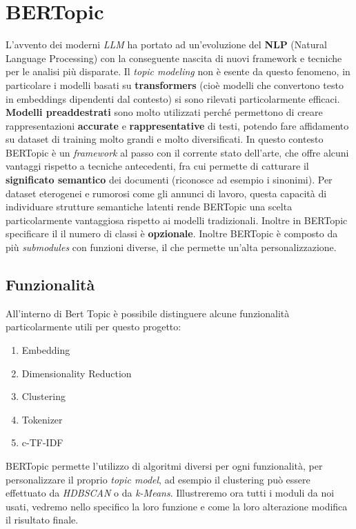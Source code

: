 \chapter{BERTopic}
L'avvento dei moderni \emph{LLM} ha portato ad un'evoluzione del \textbf{NLP} (Natural Language Processing) con la conseguente nascita di nuovi framework e tecniche per le analisi più disparate.
Il \emph{topic modeling} non è esente da questo fenomeno, in particolare i modelli basati su \textbf{transformers} (cioè modelli che convertono testo in embeddings dipendenti dal contesto) si sono rilevati particolarmente efficaci.%
\textbf{Modelli preaddestrati} sono molto utilizzati perché permettono di creare rappresentazioni \textbf{accurate} e \textbf{rappresentative} di testi, potendo fare affidamento su dataset di training molto grandi e molto diversificati.
In questo contesto BERTopic è un \textit{framework} al passo con il corrente stato dell'arte, che offre alcuni vantaggi rispetto a tecniche antecedenti, fra cui permette di catturare il \textbf{significato semantico} dei documenti (riconosce ad esempio i sinonimi). Per dataset eterogenei e rumorosi come gli annunci di lavoro, questa capacità di individuare strutture semantiche latenti rende BERTopic una scelta particolarmente vantaggiosa rispetto ai modelli tradizionali. Inoltre in BERTopic specificare il il numero di classi è \textbf{opzionale}.
Inoltre BERTopic è composto da più \textit{submodules} con funzioni diverse, il che permette un'alta personalizzazione.

\section{Funzionalità}
All'interno di Bert Topic è possibile distinguere alcune funzionalità particolarmente utili per questo progetto:
\begin{enumerate}
\item Embedding
\item Dimensionality Reduction
\item Clustering
\item Tokenizer
\item c-TF-IDF
\end{enumerate}

BERTopic permette l'utilizzo di algoritmi diversi per ogni funzionalità, per personalizzare il proprio \emph{topic model}, ad esempio il clustering può essere effettuato da \emph{HDBSCAN} o da \emph{k-Means}.
Illustreremo ora tutti i moduli da noi usati, vedremo nello specifico la loro funzione e come la loro alterazione modifica il risultato finale.
